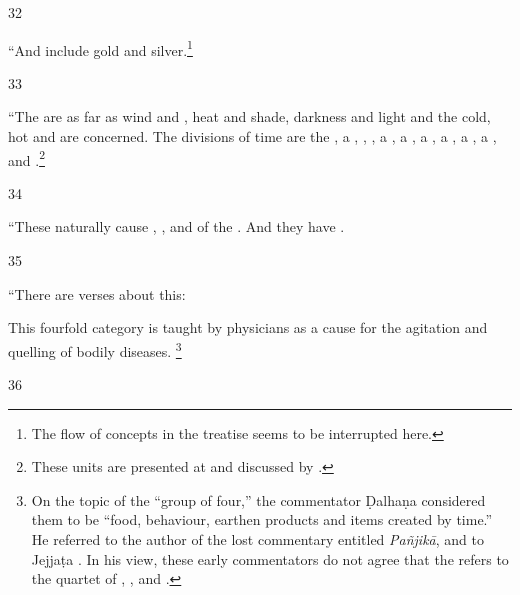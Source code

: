 \begin{translation}
    \item[32] 
    
“And  include gold and
silver.\footnote{The flow of concepts in the treatise seems to be
    interrupted here.}
    
    \item[33] 
    
“The  are 
as far as wind and , heat and shade, darkness and
light and the cold, hot and  are concerned.
The divisions of time are the , a
, , , a , a ,
a , a , a , a
, and .\footnote{These units are
    presented at  and discussed by
    \citet[\S\,59]{haya-2017}.}
    
    
    \item[34] 
    
“These naturally cause 
    , 
    , 
    and 
     of the . And they have
    .
    
   
    
    \item[35] 
    
“There are verses about this:
     \begin{sloka}
        This fourfold category is taught by physicians as a cause for the agitation and 
        quelling of bodily diseases.%
        \footnote{On the topic of the “group of four,” the commentator Ḍalhaṇa
        considered them to be “food, behaviour, earthen products and items 
        created by
        time.”  He referred to the author of the lost commentary entitled 
        \emph{Pañjikā},
        and to Jejjaṭa \citep[IA, 372--3, 192]{meul-hist}.  In his view, these early
        commentators  do not agree that the  
        refers
        to the quartet of , ,
         and  \citep[9a]{vulgate}.}
    \end{sloka}
    

    \item[36] 
    

\end{translation}
